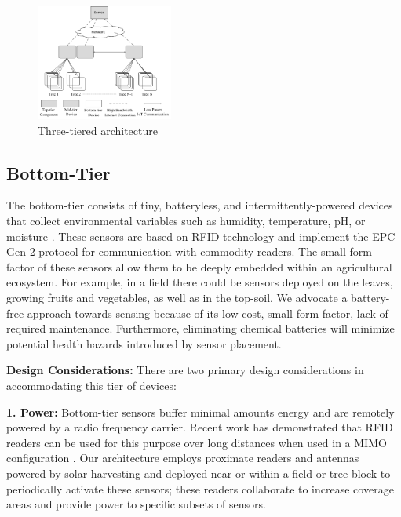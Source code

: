 \begin{figure}[t]
\centering
\includegraphics[width=0.4\textwidth]{./figures/arch_v2.pdf}
\caption{Three-tiered architecture}
\label{fig:architecture}
\end{figure}


\subsection{Bottom-Tier}
The bottom-tier consists of tiny, batteryless, and intermittently-powered devices that collect environmental variables such as humidity, temperature, pH, or moisture \cite{SensorsA98:online}. These sensors are based on RFID technology and implement the EPC Gen 2 protocol\cite{EPCUHFGe31:online} for communication with commodity readers. The small form factor of these sensors allow them to be deeply embedded within an agricultural ecosystem. %
For example, in a field there could be sensors deployed on the leaves, growing fruits and vegetables, as well as in the top-soil. We advocate a battery-free approach towards sensing because of its low cost, small form factor, lack of required maintenance. Furthermore, eliminating chemical batteries will minimize potential health hazards introduced by sensor placement. 

\noindent\textbf{Design Considerations:} There are two primary design considerations in accommodating this tier of devices:

\noindent\textbf{1. Power:} 
 Bottom-tier sensors buffer minimal amounts energy and are remotely powered by a radio frequency carrier. Recent work has demonstrated that RFID readers can be used for this purpose over long distances when used in a MIMO configuration \cite{wang2019pushing}. Our architecture employs proximate readers and antennas powered by solar harvesting and deployed near or within a field or tree block to periodically activate these sensors; these readers collaborate to increase coverage areas and provide power to specific subsets of sensors.%

